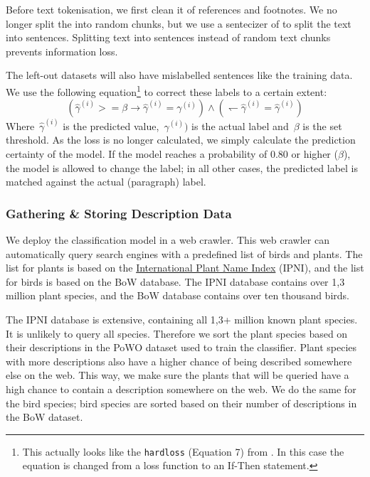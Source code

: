 \documentclass[a4paper, 12pt, oneside]{book} %
\begin{document}
Before text tokenisation, we first clean it of references and footnotes.
We no longer split the into random chunks, but we use a sentecizer of \textcite{honnibal_spacy_2020} to split the text into sentences.
Splitting text into sentences instead of random text chunks prevents information loss.

The left-out datasets will also have mislabelled sentences like the training data.
We use the following equation\footnote{This actually looks like the \texttt{hardloss} (Equation 7) from \textcite{reed_training_2015}. In this case the equation is changed from a loss function to an If-Then statement.} to correct these labels to a certain extent:
\begin{equation} \label{eq:softloss_ifthen}
(\hat{\gamma}^{(i)} >= \beta \rightarrow \hat{\gamma}^{(i)} = \gamma^{(i)}) \wedge ( \leftharpoondown \hat{\gamma}^{(i)} = \hat{\gamma}^{(i)})
\end{equation}
Where~$\hat{\gamma}^{(i)}$ is the predicted value,~$\gamma^{(i)})$ is the actual label and~$\beta$ is the set threshold. 
As the loss is no longer calculated, we simply calculate the prediction certainty of the model.
If the model reaches a probability of 0.80 or higher (\(\beta\)), the model is allowed to change the label; in all other cases, the predicted label is matched against the actual (paragraph) label.


\subsubsection{Gathering \& Storing Description Data}
We deploy the classification model in a web crawler.
This web crawler can automatically query search engines with a predefined list of birds and plants.
The list for plants is based on the \href{https://www.ipni.org/}{International Plant Name Index} (IPNI), and the list for birds is based on the BoW database. %
The IPNI database contains over 1,3 million plant species, and the BoW database contains over ten thousand birds.

The IPNI database is extensive, containing all 1,3+ million known plant species.
It is unlikely to query all species. 
Therefore we sort the plant species based on their descriptions in the PoWO dataset used to train the classifier.
Plant species with more descriptions also have a higher chance of being described somewhere else on the web.
This way, we make sure the plants that will be queried have a high chance to contain a description somewhere on the web.
We do the same for the bird species; bird species are sorted based on their number of descriptions in the BoW dataset.
\end{document}
